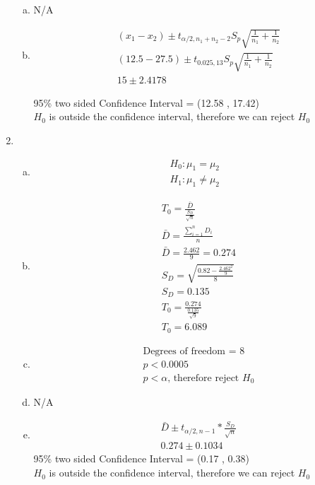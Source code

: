 \documentclass[14pt]{article}
\begin{document}
\begin{enumerate}
\begin{enumerate}[(a)]
\item
N/A

\item
\begin{align*}
& (x_1 - x_2) \pm t_{\alpha / 2, n_1 + n_2 -2} S_p \sqrt{\frac{1}{n_1} + \frac{1}{n_2}} \\[15pt]
& (12.5 - 27.5) \pm t_{0.025,13} S_p \sqrt{\frac{1}{n_1} + \frac{1}{n_2}} \\[15pt]
& 15 \pm 2.4178 
\end{align*}

95\% two sided Confidence Interval = (12.58 , 17.42) \\
$H_0$ is outside the confidence interval, therefore we can reject $H_0$

\end{enumerate}

\item
\begin{enumerate}[(a)]
\item
\begin{align*}
H_0: \mu_1 = \mu_2 \\[15pt]
H_1: \mu_1 \neq \mu_2
\end{align*}

\item
\begin{align*}
& T_0 = \frac{\bar{D}}{\frac{S_D}{\sqrt{n}}} \\[15pt]
& \bar{D} = \frac{\sum_{i=1}^{n} D_i}{n} \\[15pt]
& \bar{D} = \frac{2.462}{9} = 0.274 \\[15pt]
& S_D = \sqrt{\frac{0.82 - \frac{2.462^2}{9}}{8}} \\[15pt]
& S_D = 0.135 \\[15pt]
& T_0 =\frac{0.274}{\frac{0.135}{\sqrt{9}}} \\[15pt]
& T_0 = 6.089
\end{align*}

\item
\begin{align*}
& \text{Degrees of freedom = } 8 \\[15pt]
& p < 0.0005 \\[15pt]
& p < \alpha \text{, therefore reject } H_0 
\end{align*}

\item
N/A

\item
\begin{align*}
& \bar{D} \pm t_{\alpha / 2, n-1} * \frac{S_D}{\sqrt{n}} \\[15pt]
& 0.274 \pm 0.1034
\end{align*}
95\% two sided Confidence Interval = (0.17 , 0.38) \\
$H_0$ is outside the confidence interval, therefore we can reject $H_0$

\end{enumerate}

\end{enumerate}
\end{document}
